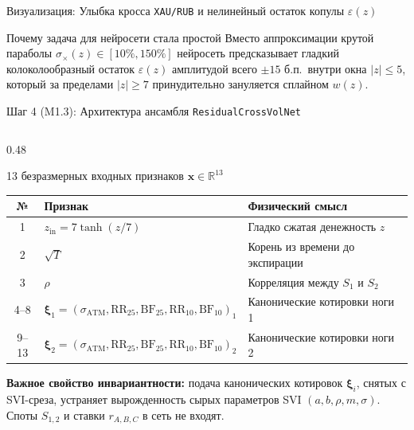 \documentclass[aspectratio=169, 9pt]{beamer}
\begin{document}
\begin{frame}{Визуализация: Улыбка кросса \texttt{XAU/RUB} и нелинейный остаток копулы $\varepsilon(z)$}
  \vspace{0.1cm}
  \begin{block}{\scriptsize Почему задача для нейросети стала простой}
    \scriptsize Вместо аппроксимации крутой параболы $\sigma_\times(z) \in [10\%, 150\%]$ нейросеть предсказывает гладкий колоколообразный остаток $\varepsilon(z)$ амплитудой всего $\pm 15$ б.п.\ внутри окна $|z| \le 5$, который за пределами $|z| \ge 7$ принудительно зануляется сплайном $w(z)$.
  \end{block}
\end{frame}

\begin{frame}{Шаг 4 (M1.3): Архитектура ансамбля \texttt{ResidualCrossVolNet}}
  \begin{columns}[T]
    \begin{column}{0.48\textwidth}
      \begin{block}{13 безразмерных входных признаков $\bm{x} \in \mathbb{R}^{13}$}
        \footnotesize
        \begin{tabular}{@{}cll@{}}
          \toprule
          \textbf{№} & \textbf{Признак} & \textbf{Физический смысл} \\
          \midrule
          1 & $z_{\text{in}} = 7\tanh(z/7)$ & Гладко сжатая денежность $z$ \\
          2 & $\sqrt{T}$ & Корень из времени до экспирации \\
          3 & $\rho$ & Корреляция между $S_1$ и $S_2$ \\
          4--8 & $\bm{\xi}_1 = (\sigma_{\text{ATM}}, \text{RR}_{25}, \text{BF}_{25}, \text{RR}_{10}, \text{BF}_{10})_1$ & Канонические котировки ноги 1 \\
          9--13 & $\bm{\xi}_2 = (\sigma_{\text{ATM}}, \text{RR}_{25}, \text{BF}_{25}, \text{RR}_{10}, \text{BF}_{10})_2$ & Канонические котировки ноги 2 \\
          \bottomrule
        \end{tabular}
        \vspace{0.2em}

        \textbf{Важное свойство инвариантности:} подача канонических котировок $\bm{\xi}_i$, снятых с SVI-среза, устраняет вырожденность сырых параметров SVI $(a,b,\rho,m,\sigma)$. Споты $S_{1,2}$ и ставки $r_{A,B,C}$ в сеть не входят.
      \end{block}
    \end{column}


\end{columns}
\end{frame}
\end{document}
